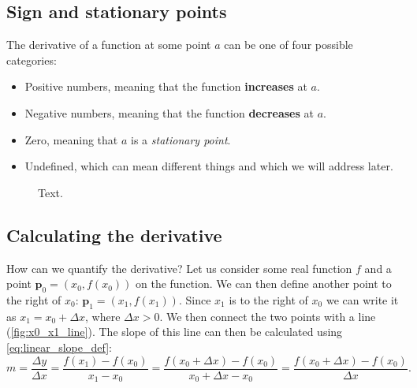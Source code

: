 \subsection{Sign and stationary points}
\label{sub:sign and stationary points}
The derivative of a function at some point $a$ can be one of four possible categories:
\begin{itemize}
  \item Positive numbers, meaning that the function \textbf{increases} at $a$.
  \item Negative numbers, meaning that the function \textbf{decreases} at $a$.
  \item Zero, meaning that $a$ is a \emph{stationary point}.
  \item Undefined, which can mean different things and which we will address later.
\end{itemize}

\begin{figure}
  \centering
  \caption{Text.}
  \label{fig:x0_x1_line}
\end{figure}

\subsection{Calculating the derivative}
\label{sub:calculating the derivative}
How can we quantify the derivative? Let us consider some real function $f$ and a point $\bm{p}_{0} = \left(x_{0},f\left(x_{0}\right)\right)$ on the function. We can then define another point to the right of $x_{0}$: $\bm{p}_{1}=\left(x_{1},f\left(x_{1}\right)\right)$. Since $x_{1}$ is to the right of $x_{0}$ we can write it as $x_{1}=x_{0}+\Delta x$, where $\Delta x>0$. We then connect the two points with a line (\autoref{fig:x0_x1_line}). The slope of this line can then be calculated using \autoref{eq:linear_slope_def}:
\begin{equation}
  m = \frac{\Delta y}{\Delta x} = \frac{f\left(x_{1}\right)-f\left(x_{0}\right)}{x_{1}-x_{0}} = \frac{f\left(x_{0}+\Delta x\right)-f\left(x_{0}\right)}{x_{0}+\Delta x - x_{0}} = \frac{f\left(x_{0}+\Delta x\right)-f\left(x_{0}\right)}{\Delta x}.
  \label{eq:derivative_slope_def}
\end{equation}

